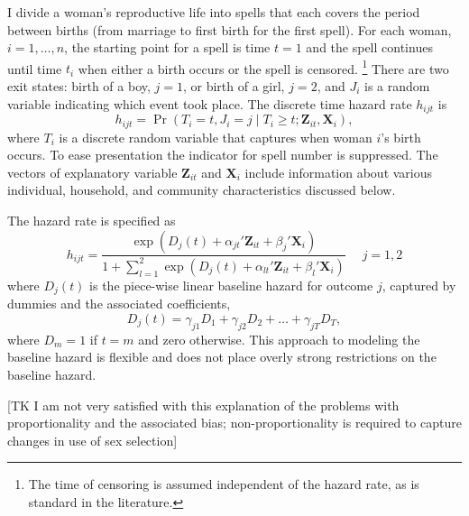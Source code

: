 \documentclass[12pt,letterpaper]{article}
\begin{document}
I divide a woman's reproductive life into spells that each covers 
the period between births (from marriage to first birth for the first spell).
For each woman, $i=1,\ldots,n$, the starting point for a spell is time $t=1$ and 
the spell continues until time $t_i$ when either a birth occurs or the spell 
is censored.%
\footnote{
The time of censoring is assumed independent of the hazard rate,
as is standard in the literature.
}
There are two exit states: birth of a boy, $j=1$, or birth of a girl, $j=2$, and 
$J_i$ is a random variable indicating which event took place.
The discrete time hazard rate $h_{ijt}$ is
\begin{equation}
 h_{ijt} = \Pr (T_i=t, J_i=j \mid T_i \geq t; \mathbf{Z}_{it},\mathbf{X}_{i} ),
\end{equation}
where $T_i$ is a discrete random variable that captures when woman $i$'s birth occurs.
To ease presentation the indicator for spell number is suppressed.
The vectors of explanatory variable $\mathbf{Z}_{it}$ and $\mathbf{X}_{i}$ include 
information about various individual, household, and community characteristics 
discussed below.

The hazard rate is specified as
\begin{equation}
 h_{ijt} = \frac{\exp(D_j(t) + \alpha_{jt}'\mathbf{Z}_{it} + \beta_j'\mathbf{X}_{i})} 
 {1 + \sum_{l=1}^2 \exp(D_j(t) + \alpha_{lt}'\mathbf{Z}_{it} + \beta_l'\mathbf{X}_{i})} \: \: \; \; \;  j = 1,2
 \label{eq:hazard}
\end{equation}
where $D_{j}(t)$ is the piece-wise linear baseline hazard for outcome $j$, captured
by dummies and the associated coefficients,
\begin{equation}
D_j(t) = \gamma_{j1} D_1 + \gamma_{j2} D_2 + \ldots + \gamma_{jT} D_T,
\end{equation}
where $D_m = 1$ if $t=m$ and zero otherwise.
This approach to modeling the baseline hazard is flexible and does not place 
overly strong restrictions on the baseline hazard.

[TK I am not very satisfied with this explanation of the problems with
proportionality and the associated bias; non-proportionality is required
to capture changes in use of sex selection]
\end{document}
